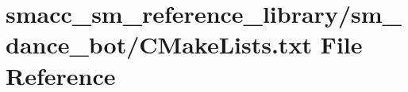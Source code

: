 \hypertarget{smacc__sm__reference__library_2sm__dance__bot_2CMakeLists_8txt}{}\section{smacc\+\_\+sm\+\_\+reference\+\_\+library/sm\+\_\+dance\+\_\+bot/\+C\+Make\+Lists.txt File Reference}
\label{smacc__sm__reference__library_2sm__dance__bot_2CMakeLists_8txt}
